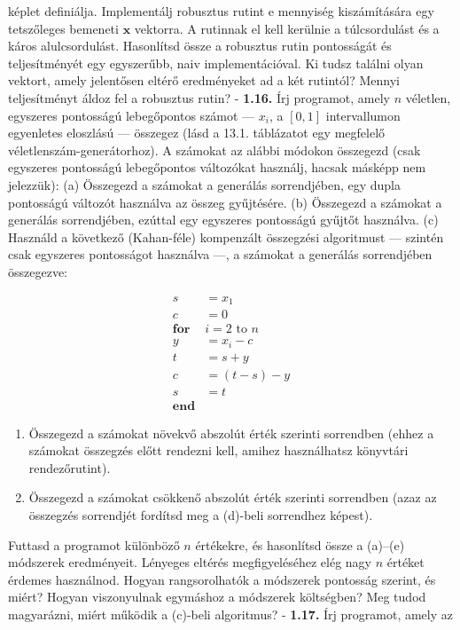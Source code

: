 \documentclass[
  magyar,
  11pt]{article}
\providecommand{\tightlist}{%
  \setlength{\itemsep}{0pt}\setlength{\parskip}{0pt}}
\providecommand{\boldsymbol}[1]{\mathbf{#1}}
\begin{document}
képlet definiálja. Implementálj robusztus rutint e mennyiség
kiszámítására egy tetszőleges bemeneti \(\boldsymbol{x}\) vektorra. A
rutinnak el kell kerülnie a túlcsordulást és a káros alulcsordulást.
Hasonlítsd össze a robusztus rutin pontosságát és teljesítményét egy
egyszerűbb, naiv implementációval. Ki tudsz találni olyan vektort, amely
jelentősen eltérő eredményeket ad a két rutintól? Mennyi teljesítményt
áldoz fel a robusztus rutin? - \textbf{1.16.} Írj programot, amely \(n\)
véletlen, egyszeres pontosságú lebegőpontos számot --- \(x_i\), a
\([0, 1]\) intervallumon egyenletes eloszlású --- összegez (lásd a 13.1.
táblázatot egy megfelelő véletlenszám-generátorhoz). A számokat az
alábbi módokon összegezd (csak egyszeres pontosságú lebegőpontos
változókat használj, hacsak másképp nem jelezzük): (a) Összegezd a
számokat a generálás sorrendjében, egy dupla pontosságú változót
használva az összeg gyűjtésére. (b) Összegezd a számokat a generálás
sorrendjében, ezúttal egy egyszeres pontosságú gyűjtőt használva. (c)
Használd a következő (Kahan-féle) kompenzált összegzési algoritmust ---
szintén csak egyszeres pontosságot használva ---, a számokat a generálás
sorrendjében összegezve:

\[\begin{aligned}
s &= x_1 \\
c &= 0 \\
\textbf{for } &i = 2 \text{ to } n \\
y &= x_i - c \\
t &= s + y \\
c &= (t - s) - y \\
s &= t \\
\textbf{end}&
\end{aligned}\]

\begin{enumerate}
\def\labelenumi{(\alph{enumi})}
\setcounter{enumi}{3}
\tightlist
\item
  Összegezd a számokat növekvő abszolút érték szerinti sorrendben (ehhez
  a számokat összegzés előtt rendezni kell, amihez használhatsz
  könyvtári rendezőrutint).
\item
  Összegezd a számokat csökkenő abszolút érték szerinti sorrendben (azaz
  az összegzés sorrendjét fordítsd meg a (d)-beli sorrendhez képest).
\end{enumerate}

Futtasd a programot különböző \(n\) értékekre, és hasonlítsd össze a
(a)--(e) módszerek eredményeit. Lényeges eltérés megfigyeléséhez elég
nagy \(n\) értéket érdemes használnod. Hogyan rangsorolhatók a módszerek
pontosság szerint, és miért? Hogyan viszonyulnak egymáshoz a módszerek
költségben? Meg tudod magyarázni, miért működik a (c)-beli algoritmus? -
\textbf{1.17.} Írj programot, amely az
\end{document}
